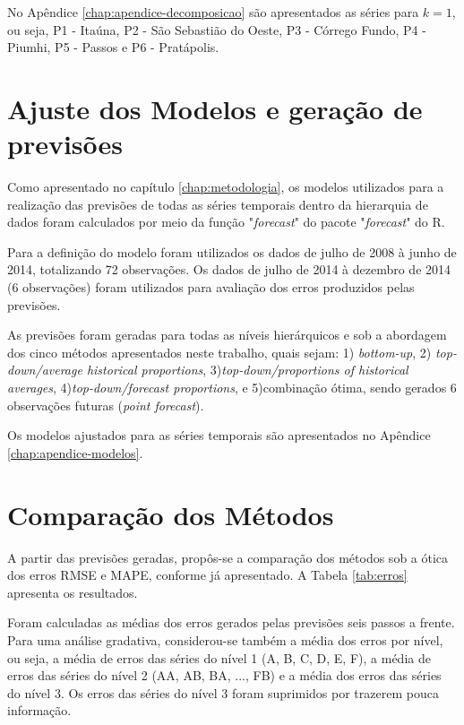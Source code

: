 \documentclass[
	12pt,				%
	openright,			%
	twoside,			%
	a4paper,			%
	english,			%
	french,				%
	spanish,			%
	brazil				%
	]{abntex2}
\begin{document}
No Apêndice \ref{chap:apendice-decomposicao} são apresentados as séries para $k = 1$, ou seja, P1 - Itaúna, P2 - São Sebastião do Oeste, P3 - Córrego Fundo, P4 - Piumhi, P5 - Passos e P6 - Pratápolis.


\section{Ajuste dos Modelos e geração de previsões}

Como apresentado no capítulo \ref{chap:metodologia}, os modelos utilizados para a realização das previsões de todas as séries temporais dentro da hierarquia de dados foram calculados por meio da função "\emph{forecast}"  do pacote "\emph{forecast}" do R. 

Para a definição do modelo foram utilizados os dados de julho de 2008 à junho de 2014, totalizando 72 observações. Os dados de julho de 2014 à dezembro de 2014 (6 observações) foram utilizados para avaliação dos erros produzidos pelas previsões.

As previsões foram geradas para todas as níveis hierárquicos e sob a abordagem dos cinco métodos apresentados neste trabalho, quais sejam: 1) \emph{bottom-up}, 2) \emph{top-down/average historical proportions}, 3)\emph{top-down/proportions of historical averages}, 4)\emph{top-down/forecast proportions}, e 5)combinação ótima, sendo gerados 6 observações futuras (\emph{point forecast}).

Os modelos ajustados para as séries temporais são apresentados no Apêndice \ref{chap:apendice-modelos}. %



\section{Comparação dos Métodos}

A partir das previsões geradas, propôs-se a comparação dos métodos sob a ótica dos erros RMSE e MAPE, conforme já apresentado. A Tabela \ref{tab:erros} apresenta os resultados.

Foram calculadas as médias dos erros gerados pelas previsões seis passos a frente. Para uma análise gradativa, considerou-se também a média dos erros por nível, ou seja, a média de erros das séries do nível 1 (A, B, C, D, E, F), a média de erros das séries do nível 2 (AA, AB, BA, ..., FB) e a média dos erros das séries do nível 3.
Os erros das séries do nível 3 foram suprimidos por trazerem pouca informação.
\end{document}
